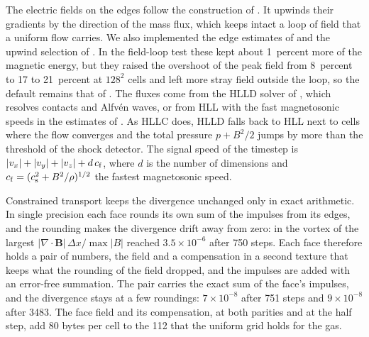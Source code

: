 \documentclass[twocolumn]{aastex701}
\begin{document}
The electric fields on the edges follow the construction of \citet{GardinerStone2005}. It upwinds their gradients by the direction of the mass flux, which keeps intact a loop of field that a uniform flow carries. We also implemented the edge estimates of \citet{LeeDeane2009} and the upwind selection of \citet{Lee2013}. In the field-loop test these kept about 1~percent more of the magnetic energy, but they raised the overshoot of the peak field from 8~percent to 17 to 21~percent at $128^2$ cells and left more stray field outside the loop, so the default remains that of \citet{GardinerStone2005}. The fluxes come from the HLLD solver of \citet{Miyoshi2005}, which resolves contacts and Alfv\'en waves, or from HLL with the fast magnetosonic speeds in the estimates of \citet{Davis1988}. As HLLC does, HLLD falls back to HLL next to cells where the flow converges and the total pressure $p + B^2/2$ jumps by more than the threshold of the shock detector. The signal speed of the timestep is $|v_x| + |v_y| + |v_z| + d\,c_{\rm f}$, where $d$ is the number of dimensions and $c_{\rm f} = (c_{\rm s}^2 + B^2/\rho)^{1/2}$ the fastest magnetosonic speed.

Constrained transport keeps the divergence unchanged only in exact arithmetic. In single precision each face rounds its own sum of the impulses from its edges, and the rounding makes the divergence drift away from zero: in the vortex of \citet{Orszag1979} the largest $|\nabla\cdot\mathbf{B}|\,\Delta x/\max|B|$ reached $3.5\times10^{-6}$ after 750 steps. Each face therefore holds a pair of numbers, the field and a compensation in a second texture that keeps what the rounding of the field dropped, and the impulses are added with an error-free summation. The pair carries the exact sum of the face's impulses, and the divergence stays at a few roundings: $7\times10^{-8}$ after 751 steps and $9\times10^{-8}$ after 3483. The face field and its compensation, at both parities and at the half step, add 80 bytes per cell to the 112 that the uniform grid holds for the gas.
\end{document}
